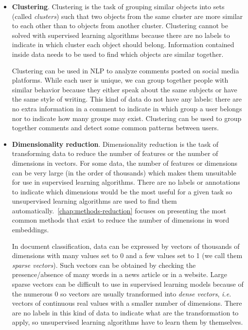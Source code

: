     \begin{itemize}
      \item \textbf{Clustering}. Clustering is the task of grouping similar
        objects into sets (called \textit{clusters}) such that two objects from
        the same cluster are more similar to each other than to objects from
        another cluster. Clustering cannot be solved with supervised learning
        algorithms because there are no labels to indicate in which cluster each
        object should belong. Information contained inside data needs to be used
        to find which objects are similar together.

        Clustering can be used in NLP to analyze comments posted on social media
        platforms. While each user is unique, we can group together people with
        similar behavior because they either speak about the same subjects or
        have the same style of writing. This kind of data do not have any
        labels: there are no extra information in a comment to indicate in which
        group a user belongs nor to indicate how many groups may exist.
        Clustering can be used to group together comments and detect some common
        patterns between users.

      \item \textbf{Dimensionality reduction}. Dimensionality reduction is the
        task of transforming data to reduce the number of features or the number
        of dimensions in vectors. For some data, the number of features or
        dimensions can be very large (in the order of thousands) which makes
        them unsuitable for use in supervised learning algorithms. There are no
        labels or annotations to indicate which dimensions would be the most
        useful for a given task so unsupervised learning algorithms are used to
        find them automatically.~\autoref{chap:methods-reduction} focuses on
        presenting the most common methods that exist to reduce the number of
        dimensions in word embeddings.

        In document classification, data can be expressed by vectors of
        thousands of dimensions with many values set to 0 and a few values set
        to 1 (we call them \textit{sparse vectors}). Such vectors can be
        obtained by checking the presence/absence of many words in a news
        article or in a website. Large sparse vectors can be difficult to use in
        supervised learning models because of the numerous 0 so vectors are
        usually transformed into \textit{dense vectors}, \textit{i.e.} vectors
        of continuous real values with a smaller number of dimensions. There are
        no labels in this kind of data to indicate what are the transformation
        to apply, so unsupervised learning algorithms have to learn them by
        themselves.
    \end{itemize}

